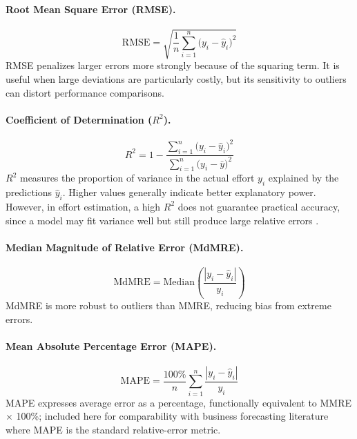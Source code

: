 \documentclass[11pt,a4paper]{article}
\begin{document}
\paragraph{Root Mean Square Error (RMSE).}
\begin{equation}
\mathrm{RMSE} = \sqrt{\frac{1}{n}\sum_{i=1}^{n}\bigl(y_i-\hat{y}_i\bigr)^2}
\label{eq:rmse}
\end{equation}
RMSE penalizes larger errors more strongly because of the squaring term. 
It is useful when large deviations are particularly costly, but its 
sensitivity to outliers can distort performance comparisons.

\paragraph{Coefficient of Determination ($R^2$).}
\begin{equation}
R^2 = 1 - \frac{\sum_{i=1}^{n}\bigl(y_i-\hat{y}_i\bigr)^2}{\sum_{i=1}^{n}\bigl(y_i-\bar{y}\bigr)^2}
\label{eq:r2}
\end{equation}
$R^2$ measures the proportion of variance in the actual effort $y_i$ 
explained by the predictions $\hat{y}_i$. Higher values generally indicate 
better explanatory power. However, in effort estimation, a high $R^2$ does 
not guarantee practical accuracy, since a model may fit variance well but 
still produce large relative errors \cite{kitchenham2001evaluating}.

\paragraph{Median Magnitude of Relative Error (MdMRE).}
\begin{equation}
\mathrm{MdMRE} = \mathrm{Median}\left(\frac{|y_i-\hat{y}_i|}{y_i}\right)
\label{eq:mdmre}
\end{equation}
MdMRE is more robust to outliers than MMRE, reducing bias from extreme errors.

\paragraph{Mean Absolute Percentage Error (MAPE).}
\begin{equation}
\mathrm{MAPE} = \frac{100\%}{n}\sum_{i=1}^{n}\frac{|y_i-\hat{y}_i|}{y_i}
\label{eq:mape}
\end{equation}
MAPE expresses average error as a percentage, functionally equivalent to MMRE $\times$ 100\%; included here for comparability with business forecasting literature where MAPE is the standard relative-error metric.
\end{document}
